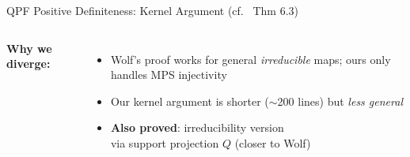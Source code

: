 \documentclass[aspectratio=169,10pt]{beamer}
\begin{document}
\begin{frame}{QPF Positive Definiteness: Kernel Argument \textnormal{(cf.\ \cite{Wolf2012Quantum} Thm 6.3)}}
\begin{columns}[T]
        \vspace{0.3em}
        \textbf{\textcolor{amber}{Why we diverge:}}
        \begin{itemize}\itemsep0.1em\small
            \item Wolf's proof works for general \emph{irreducible} maps;
                ours only handles MPS injectivity
            \item Our kernel argument is shorter ($\sim$200 lines)
                but \emph{less general}
            \item \textbf{Also proved}: irreducibility version\\
                {\tiny via support projection $Q$ (closer to Wolf)}
        \end{itemize}
    \end{columns}
\end{frame}
\end{document}
